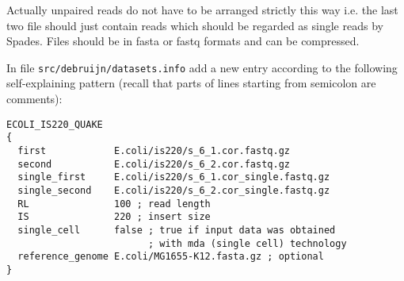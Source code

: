 \documentclass{article}
\begin{document}
Actually unpaired reads do not have to be arranged strictly this way i.e. the last two file should just contain reads 
which should be regarded as single reads by Spades.
Files should be in fasta or fastq formats and can be compressed.

In file {\tt src/debruijn/datasets.info} add a new entry according to the following self-explaining pattern (recall that parts of lines starting from
semicolon are comments):
\begin{lstlisting}
ECOLI_IS220_QUAKE
{
  first            E.coli/is220/s_6_1.cor.fastq.gz
  second           E.coli/is220/s_6_2.cor.fastq.gz
  single_first     E.coli/is220/s_6_1.cor_single.fastq.gz
  single_second    E.coli/is220/s_6_2.cor_single.fastq.gz
  RL               100 ; read length
  IS               220 ; insert size
  single_cell      false ; true if input data was obtained 
                         ; with mda (single cell) technology
  reference_genome E.coli/MG1655-K12.fasta.gz ; optional
}
\end{lstlisting}



\end{document}

